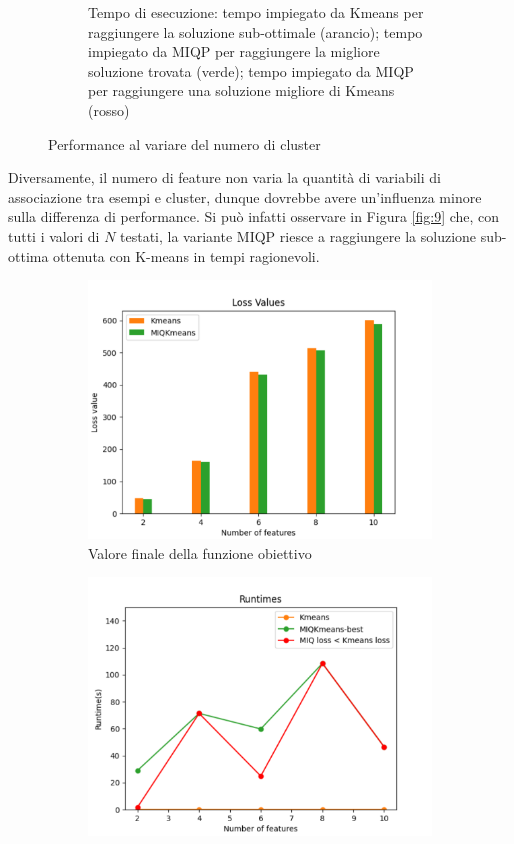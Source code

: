 \documentclass{article}
\begin{document}
\begin{figure}[H]
\begin{subfigure}[t]{0.49\linewidth}
         \caption{Tempo di esecuzione: tempo impiegato da Kmeans per raggiungere la soluzione sub-ottimale (arancio); tempo impiegato da MIQP per raggiungere la migliore soluzione trovata (verde); tempo impiegato da MIQP per raggiungere una soluzione migliore di Kmeans (rosso)}
     \end{subfigure}
        \label{fig:8}
        \caption{Performance al variare del numero di cluster}
     \end{figure}
    Diversamente, il numero di feature non varia la quantità di variabili di associazione tra esempi e cluster, dunque dovrebbe avere un'influenza minore sulla differenza di performance. Si può infatti osservare in Figura \ref{fig:9} che, con tutti i valori di $N$ testati, la variante MIQP riesce a raggiungere la soluzione sub-ottima ottenuta con K-means in tempi ragionevoli.
    \begin{figure}[H]
     \centering
     \begin{subfigure}[t]{0.49\linewidth}
         \centering
         \includegraphics[width=\linewidth]{../results/plots/loss_features_heart}
         \caption{Valore finale della funzione obiettivo}
     \end{subfigure}
     \hfill
     \begin{subfigure}[t]{0.49\linewidth}
         \centering
         \includegraphics[width=\linewidth]{../results/plots/runtime_features_heart}

\end{subfigure}
\end{figure}
\end{document}
